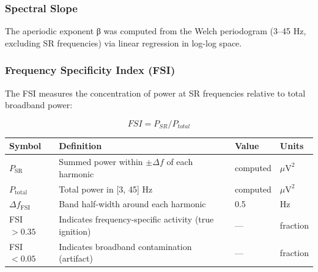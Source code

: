 \documentclass[11pt,a4paper]{article}
\begin{document}
\subsubsection{Spectral Slope}
The aperiodic exponent β was computed from the Welch periodogram (3–45 Hz, excluding SR frequencies) via linear regression in log-log space.
\begin{table}[H]
    \centering
     \end{table}
\subsubsection{Frequency Specificity Index (FSI)}
The FSI measures the concentration of power at SR frequencies relative to total broadband power:

\begin{displaymath}
FSI = P_{SR} / P_{total}
\end{displaymath}

\begin{table}[H]
    \centering
    \begin{tabular}{llll}
        \toprule
        Symbol & Definition & Value & Units \\
        \midrule
        $P_{\text{SR}}$ & Summed power within $\pm\Delta f$ of each harmonic & computed & $\mu\text{V}^2$ \\
        $P_{\text{total}}$ & Total power in [3, 45] Hz & computed & $\mu\text{V}^2$ \\
        $\Delta f_{\text{FSI}}$ & Band half-width around each harmonic & 0.5 & Hz \\
        FSI $> 0.35$ & Indicates frequency-specific activity (true ignition) & --- & fraction \\
        FSI $< 0.05$ & Indicates broadband contamination (artifact) & --- & fraction \\
        \bottomrule
    \end{tabular}
\end{table}
\end{document}
